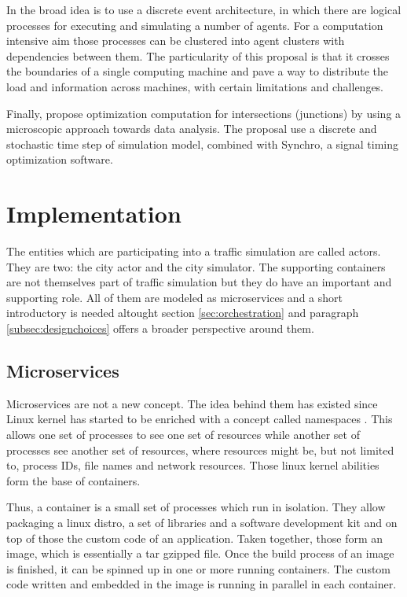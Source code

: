 \documentclass[conference]{IEEEtran}
\begin{document}
In \cite{8569576} the broad idea is to use a discrete event architecture, in which there are logical processes for executing and simulating a number of agents. For a computation intensive aim those processes can be clustered into agent clusters with dependencies between them. The particularity of this proposal is that it crosses the boundaries of a single computing machine and pave a way to distribute the load and information across machines, with certain limitations and challenges.

Finally, \cite{6244609} propose optimization computation for intersections (junctions) by using a microscopic approach towards data analysis. The proposal use a discrete and stochastic time step of simulation model, combined with Synchro, a signal timing optimization software.

\section{Implementation}
\label{sec:implementation}

The entities which are participating into a traffic simulation are called actors. They are two: the city actor and the city simulator. The supporting containers are not themselves part of traffic simulation but they do have an important and supporting role. All of them are modeled as microservices and a short introductory is needed altought section \ref{sec:orchestration} and paragraph \ref{subsec:designchoices} offers a broader perspective around them.

\subsection{Microservices}

Microservices are not a new concept. The idea behind them has existed since Linux kernel has started to be enriched with a concept called namespaces \citep{wiki:linuxns}. This allows one set of processes to see one set of resources while another set of processes see another set of resources, where resources might be, but not limited to, process IDs, file names and network resources. Those linux kernel abilities form the base of containers.

Thus, a container is a small set of processes which run in isolation. They allow packaging a linux distro, a set of libraries and a software development kit and on top of those the custom code of an application. Taken together, those form an image, which is essentially a tar gzipped file. Once the build process of an image is finished, it can be spinned up in one or more running containers. The custom code written and embedded in the image is running in parallel in each container.
\end{document}
